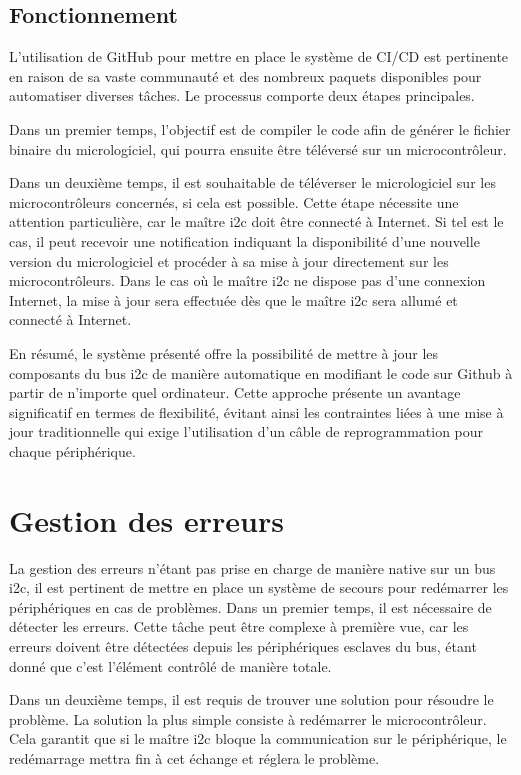 \subsection{Fonctionnement}

L'utilisation de GitHub pour mettre en place le système de CI/CD est pertinente en raison de sa vaste communauté et des nombreux paquets disponibles pour automatiser diverses tâches.
Le processus comporte deux étapes principales.

Dans un premier temps, l'objectif est de compiler le code afin de générer le fichier binaire du micrologiciel, qui pourra ensuite être téléversé sur un microcontrôleur.

Dans un deuxième temps, il est souhaitable de téléverser le micrologiciel sur les microcontrôleurs concernés, si cela est possible.
Cette étape nécessite une attention particulière, car le maître \gls{i2c} doit être connecté à Internet.
Si tel est le cas, il peut recevoir une notification indiquant la disponibilité d'une nouvelle version du micrologiciel et procéder à sa mise à jour directement sur les microcontrôleurs. Dans le cas où le maître \gls{i2c} ne dispose pas d'une connexion Internet, la mise à jour sera effectuée dès que le maître \gls{i2c} sera allumé et connecté à Internet.

En résumé, le système présenté offre la possibilité de mettre à jour les composants du bus \gls{i2c} de manière automatique en modifiant le code sur Github à partir de n'importe quel ordinateur.
Cette approche présente un avantage significatif en termes de flexibilité, évitant ainsi les contraintes liées à une mise à jour traditionnelle qui exige l'utilisation d'un câble de reprogrammation pour chaque périphérique.

\section{Gestion des erreurs}

La gestion des erreurs n'étant pas prise en charge de manière native sur un bus \gls{i2c}, il est pertinent de mettre en place un système de secours pour redémarrer les périphériques en cas de problèmes.
Dans un premier temps, il est nécessaire de détecter les erreurs.
Cette tâche peut être complexe à première vue, car les erreurs doivent être détectées depuis les périphériques esclaves du bus, étant donné que c'est l'élément contrôlé de manière totale.

Dans un deuxième temps, il est requis de trouver une solution pour résoudre le problème.
La solution la plus simple consiste à redémarrer le microcontrôleur.
Cela garantit que si le maître \gls{i2c} bloque la communication sur le périphérique, le redémarrage mettra fin à cet échange et réglera le problème.


